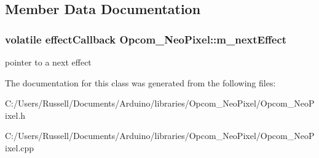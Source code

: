 \subsection{Member Data Documentation}
\subsubsection[{m\+\_\+next\+Effect}]{\setlength{\rightskip}{0pt plus 5cm}volatile effect\+Callback Opcom\+\_\+\+Neo\+Pixel\+::m\+\_\+next\+Effect\hspace{0.3cm}{\ttfamily [protected]}}\label{class_opcom___neo_pixel_ab6fe4cdc30f8bed459400661508a4dcd}
pointer to a next effect 

The documentation for this class was generated from the following files\+:\begin{DoxyCompactItemize}
\item 
C\+:/\+Users/\+Russell/\+Documents/\+Arduino/libraries/\+Opcom\+\_\+\+Neo\+Pixel/Opcom\+\_\+\+Neo\+Pixel.\+h\item 
C\+:/\+Users/\+Russell/\+Documents/\+Arduino/libraries/\+Opcom\+\_\+\+Neo\+Pixel/Opcom\+\_\+\+Neo\+Pixel.\+cpp\end{DoxyCompactItemize}
